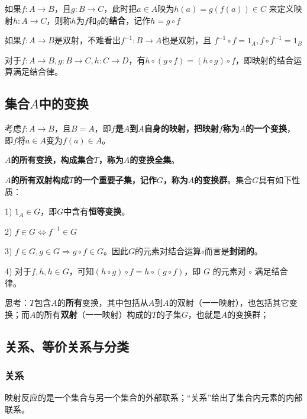 \documentclass[12pt]{article}
\begin{document}
\begin{framed}
如果$f: A \rightarrow B$，且$g: B \rightarrow C$，此时把$a \in A$映为$h(a) = g(f(a)) \in C$ 来定义映射$h: A \rightarrow C$，则称$h$为$f$和$g$的\textbf{结合}，记作$h = g\circ f$

如果$f: A \rightarrow B$是双射，不难看出$f^{-1}: B \rightarrow A$也是双射，且 $f^{-1}\circ f = 1_A, f\circ f^{-1} = 1_B$

对于$f: A \rightarrow B, g: B \rightarrow C, h: C \rightarrow D$，有$h\circ (g\circ f) = (h\circ g)\circ f$，即映射的结合运算满足结合律。
\end{framed}


\subsection{集合$A$中的变换}
考虑$f: A \rightarrow B$，且$B = A$，即\textbf{$f$是$A$到$A$自身的映射，把映射$f$称为$A$的一个变换}，即$f$将$a \in A$变为$f(a) \in A$。

\textbf{$A$的所有变换，构成集合$T$，称为$A$的变换全集}。

\textbf{$A$的所有双射构成$T$的一个重要子集，记作$G$，称为$A$的变换群}。集合$G$具有如下性质：

1) $1_A \in G$，即$G$中含有\textbf{恒等变换}。

2) $f \in G \Leftrightarrow f^{-1} \in G$

3) $f \in G, g\in G \Rightarrow g \circ f \in G$。因此$G$的元素对结合运算$\circ$而言是\textbf{封闭的}。

4) 对于$f, h, h \in G$，可知$(h \circ g) \circ f = h \circ( g \circ f)$，即 $G$ 的元素对 $\circ$ 满足结合律。

\begin{framed}
\small {
思考：$T$包含$A$的\textbf{所有}变换，其中包括从$A$到$A$的双射（一一映射），也包括其它变换；而$A$的所有\textbf{双射}（一一映射）构成的$T$的子集$G$，也就是$A$的变换群；
}
\end{framed}

\subsection{关系、等价关系与分类}
\subsubsection{关系}
映射反应的是一个集合与另一个集合的外部联系；“关系”给出了集合内元素的内部联系。
\end{document}
